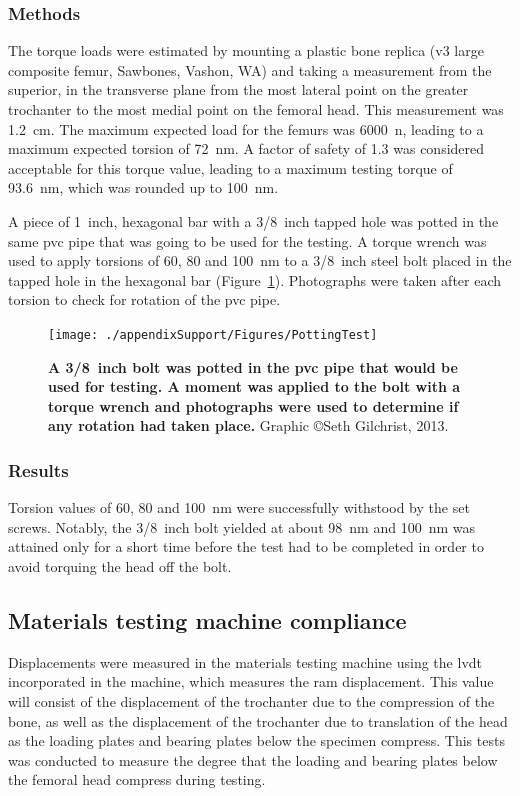 \subsubsection{Methods}
The torque loads were estimated by mounting a plastic bone replica (v3 large composite femur, Sawbones, Vashon, WA) and taking a measurement from the superior, in the transverse plane from the most lateral point on the greater trochanter to the most medial point on the femoral head.
This measurement was 1.2~\ac{cm}.
The maximum expected load for the femurs was 6000~\ac{n}, leading to a maximum expected torsion of 72~\ac{n}\ac{m}.
A factor of safety of 1.3 was considered acceptable for this torque value, leading to a maximum testing torque of 93.6~\ac{n}\ac{m}, which was rounded up to 100~\ac{n}\ac{m}.

A piece of 1~inch, hexagonal bar with a 3/8~inch tapped hole was potted in the same \ac{pvc} pipe that was going to be used for the testing.
A torque wrench was used to apply torsions of 60, 80 and 100~\ac{n}\ac{m} to a 3/8~inch steel bolt placed in the tapped hole in the hexagonal bar (Figure~\ref{fig:PottingTest}).
Photographs were taken after each torsion to check for rotation of the \ac{pvc} pipe.

\begin{figure}
\centering
\texttt{[image: ./appendixSupport/Figures/PottingTest]}
\caption[Potting torsion resistance]{\textbf{A 3/8~inch bolt was potted in the \ac{pvc} pipe that would be used for testing. A moment was applied to the bolt with a torque wrench and photographs were used to determine if any rotation had taken place.} Graphic \copyright Seth Gilchrist, 2013.}
\label{fig:PottingTest}
\end{figure}

\subsubsection{Results}
Torsion values of 60, 80 and 100~\ac{n}\ac{m} were successfully withstood by the set screws.
Notably, the 3/8~inch bolt yielded at about 98~\ac{n}\ac{m} and 100~\ac{n}\ac{m} was attained only for a short time before the test had to be completed in order to avoid torquing the head off the bolt.

\subsection{Materials testing machine compliance}
\label{sec:equipment_instron_compliance}
Displacements were measured in the materials testing machine using the \ac{lvdt} incorporated in the machine, which measures the ram displacement.
This value will consist of the displacement of the trochanter due to the compression of the bone, as well as the displacement of the trochanter due to translation of the head as the loading plates and bearing plates below the specimen compress.
This tests was conducted to measure the degree that the loading and bearing plates below the femoral head compress during testing.

